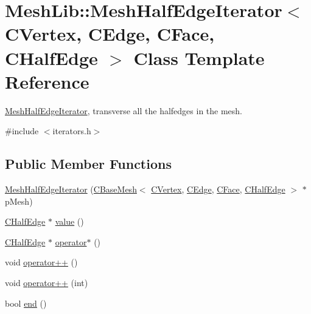 \hypertarget{class_mesh_lib_1_1_mesh_half_edge_iterator}{}\section{Mesh\+Lib\+:\+:Mesh\+Half\+Edge\+Iterator$<$ C\+Vertex, C\+Edge, C\+Face, C\+Half\+Edge $>$ Class Template Reference}
\label{class_mesh_lib_1_1_mesh_half_edge_iterator}


\hyperlink{class_mesh_lib_1_1_mesh_half_edge_iterator}{Mesh\+Half\+Edge\+Iterator}, transverse all the halfedges in the mesh.  




{\ttfamily \#include $<$iterators.\+h$>$}

\subsection*{Public Member Functions}
\begin{DoxyCompactItemize}
\item 
\hyperlink{class_mesh_lib_1_1_mesh_half_edge_iterator_ac26677f491246432895c5b138669f9c4}{Mesh\+Half\+Edge\+Iterator} (\hyperlink{class_mesh_lib_1_1_c_base_mesh}{C\+Base\+Mesh}$<$ \hyperlink{class_mesh_lib_1_1_c_vertex}{C\+Vertex}, \hyperlink{class_mesh_lib_1_1_c_edge}{C\+Edge}, \hyperlink{class_mesh_lib_1_1_c_face}{C\+Face}, \hyperlink{class_mesh_lib_1_1_c_half_edge}{C\+Half\+Edge} $>$ $\ast$p\+Mesh)
\item 
\hyperlink{class_mesh_lib_1_1_c_half_edge}{C\+Half\+Edge} $\ast$ \hyperlink{class_mesh_lib_1_1_mesh_half_edge_iterator_a1c9eef081ce9d561fd496fc62966fc41}{value} ()
\item 
\hyperlink{class_mesh_lib_1_1_c_half_edge}{C\+Half\+Edge} $\ast$ \hyperlink{class_mesh_lib_1_1_mesh_half_edge_iterator_a93d6790fcae237d61a1c95313f729255}{operator$\ast$} ()
\item 
void \hyperlink{class_mesh_lib_1_1_mesh_half_edge_iterator_afaabb0b92dd5262dbc0524d12e58b1c9}{operator++} ()
\item 
void \hyperlink{class_mesh_lib_1_1_mesh_half_edge_iterator_a3803eab6f807751e307ba12994ea88b9}{operator++} (int)
\item 
bool \hyperlink{class_mesh_lib_1_1_mesh_half_edge_iterator_a04a84ebbe6ffe17f53929626a422aad2}{end} ()
\end{DoxyCompactItemize}


